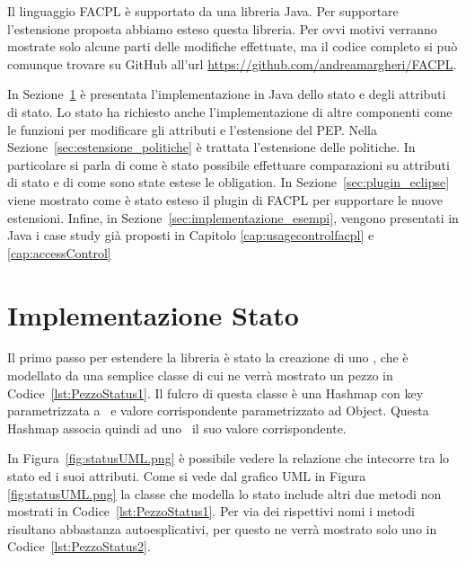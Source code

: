 \label{cap:estensione_libreria}
Il linguaggio \ac{FACPL} è supportato da una libreria Java. Per supportare l'estensione proposta
abbiamo esteso questa libreria. Per ovvi motivi verranno mostrate solo alcune parti delle modifiche effettuate, ma 
il codice completo si può comunque trovare su GitHub all'url \url{https://github.com/andreamargheri/FACPL}.\par
In Sezione~\ref{sec:imp_stato} è presentata l'implementazione in Java dello stato e degli attributi di stato. Lo stato ha richiesto anche l'implementazione di altre componenti come le funzioni per modificare gli attributi e l'estensione del \ac{PEP}.
Nella Sezione~\ref{sec:estensione_politiche} è trattata l'estensione delle politiche. In particolare si parla di come è stato possibile 
effettuare comparazioni su attributi di stato e di come sono state estese le obligation.
In Sezione~\ref{sec:plugin_eclipse} viene mostrato come è stato esteso il plugin di \ac{FACPL} per supportare le nuove estensioni.
Infine, in Sezione~\ref{sec:implementazione_esempi}, vengono presentati in Java i case study già proposti in Capitolo \ref{cap:usagecontrolfacpl} e
\ref{cap:accessControl}
\section{Implementazione Stato}
\label{sec:imp_stato}
Il primo passo per estendere la libreria è stato la creazione di uno \status, che è modellato da una semplice classe 
di cui ne verrà mostrato un pezzo in Codice~\ref{lst:PezzoStatus1}. Il fulcro di questa classe è una Hashmap con key parametrizzata a 
\statusattribute \ e valore corrispondente parametrizzato ad Object. Questa Hashmap associa quindi ad uno \statusattribute\ il suo valore corrispondente.

In Figura~\ref{fig:statusUML.png} è possibile vedere la relazione che intecorre tra lo stato ed i suoi attributi. 
Come si vede dal grafico UML in Figura \ref{fig:statusUML.png} la classe che modella lo stato include altri due metodi non mostrati in Codice~\ref{lst:PezzoStatus1}. Per via dei rispettivi nomi i metodi risultano abbastanza autoesplicativi, per questo ne verrà mostrato solo uno in Codice~\ref{lst:PezzoStatus2}.

